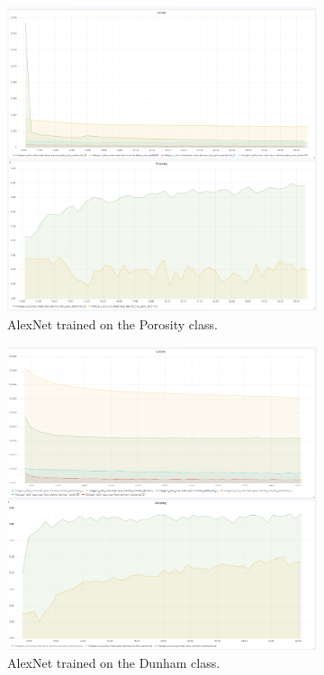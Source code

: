 \begin{figure}
\begin{subfigure}{.5\textwidth}
  \centering
  \includegraphics[width=.8\linewidth]{figures/04-Init_al_poro_acc.PNG}
  \caption{AlexNet trained on the Porosity class.}
  \label{fig:alexinit_poro}
\end{subfigure}%
\begin{subfigure}{.5\textwidth}
  \centering
  \includegraphics[width=.8\linewidth]{figures/04-Init_al_dunham_acc.PNG}
  \caption{AlexNet trained on the Dunham class.}
  \label{fig:alexinit_dunham}
\end{subfigure}
\begin{subfigure}{.5\textwidth}

\end{subfigure}
\end{figure}
